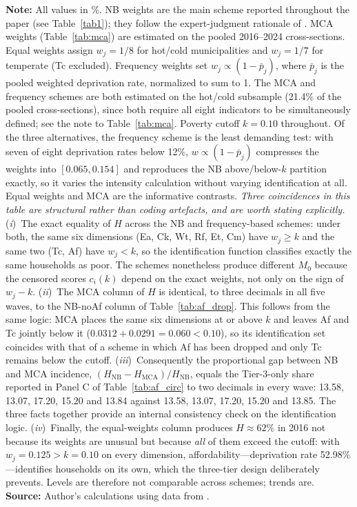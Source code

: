 \documentclass[11pt, a4paper]{article}
\begin{document}
\begin{table}[htb]
\begin{justify}
\textbf{Note:} All values in \%. NB weights are the main scheme reported throughout the paper (see Table~\ref{tab1}); they follow the expert-judgment rationale of \textcite{nussbaumer2012}. MCA weights (Table~\ref{tab:mca}) are estimated on the pooled 2016--2024 cross-sections. Equal weights assign $w_j=1/8$ for hot/cold municipalities and $w_j=1/7$ for temperate (Tc excluded). Frequency weights set $w_j \propto (1-\bar{p}_j)$, where $\bar{p}_j$ is the pooled weighted deprivation rate, normalized to sum to 1. The MCA and frequency schemes are both estimated on the hot/cold subsample (21.4\% of the pooled cross-sections), since both require all eight indicators to be simultaneously defined; see the note to Table~\ref{tab:mca}. Poverty cutoff $k=0.10$ throughout. Of the three alternatives, the frequency scheme is the least demanding test: with seven of eight deprivation rates below 12\%, $w \propto (1-\bar p_j)$ compresses the weights into $[0.065, 0.154]$ and reproduces the NB above/below-$k$ partition exactly, so it varies the intensity calculation without varying identification at all. Equal weights and MCA are the informative contrasts. \emph{Three coincidences in this table are structural rather than coding artefacts, and are worth stating explicitly.} (\textit{i})~The exact equality of $H$ across the NB and frequency-based schemes: under both, the same six dimensions (Ea, Ck, Wt, Rf, Et, Cm) have $w_j \geq k$ and the same two (Tc, Af) have $w_j < k$, so the identification function classifies exactly the same households as poor. The schemes nonetheless produce different $M_0$ because the censored scores $c_i(k)$ depend on the exact weights, not only on the sign of $w_j-k$. (\textit{ii})~The MCA column of $H$ is identical, to three decimals in all five waves, to the NB-noAf column of Table~\ref{tab:af_drop}. This follows from the same logic: MCA places the same six dimensions at or above $k$ and leaves Af and Tc jointly below it ($0.0312+0.0291=0.060<0.10$), so its identification set coincides with that of a scheme in which Af has been dropped and only Tc remains below the cutoff. (\textit{iii})~Consequently the proportional gap between NB and MCA incidence, $(H_{\mathrm{NB}}-H_{\mathrm{MCA}})/H_{\mathrm{NB}}$, equals the Tier-3-only share reported in Panel C of Table~\ref{tab:af_circ} to two decimals in every wave: 13.58, 13.07, 17.20, 15.20 and 13.84 against 13.58, 13.07, 17.20, 15.20 and 13.85. The three facts together provide an internal consistency check on the identification logic. (\textit{iv})~Finally, the equal-weights column produces $H \approx 62\%$ in 2016 not because its weights are unusual but because \emph{all} of them exceed the cutoff: with $w_j = 0.125 > k = 0.10$ on every dimension, affordability---deprivation rate 52.98\%---identifies households on its own, which the three-tier design deliberately prevents. Levels are therefore not comparable across schemes; trends are. \textbf{Source:} Author's calculations using data from \textcite{enigh2016, enigh2018, enigh2020, enigh2022, enigh2024}.
\end{justify}
\label{tab:robustness}
\end{table}
\end{document}
